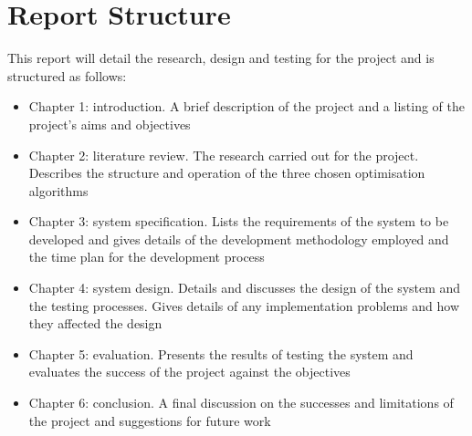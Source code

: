 \section{Report Structure}
This report will detail the research, design and testing for the project and is structured as follows:
\begin{itemize}
  \item{Chapter 1: introduction. A brief description of the project and a listing of the project's aims and objectives}
  \item{Chapter 2: literature review. The research carried out for the project. Describes the structure and operation of the three chosen optimisation algorithms}
  \item{Chapter 3: system specification. Lists the requirements of the system to be developed and gives details of the development methodology employed and the time plan for the development process}
  \item{Chapter 4: system design. Details and discusses the design of the system and the testing processes. Gives details of any implementation problems and how they affected the design}
  \item{Chapter 5: evaluation. Presents the results of testing the system and evaluates the success of the project against the objectives}
  \item{Chapter 6: conclusion. A final discussion on the successes and limitations of the project and suggestions for future work}
\end{itemize}
